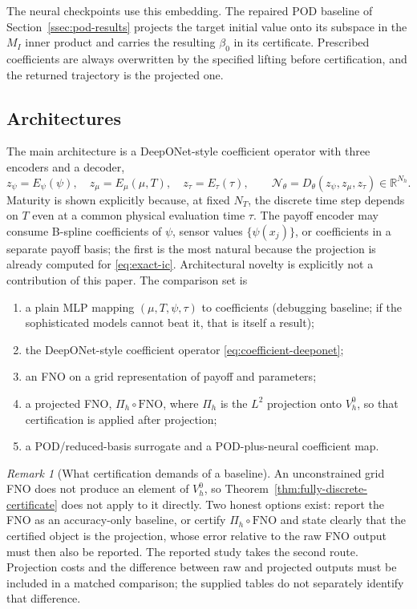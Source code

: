 \documentclass[11pt]{amsart}
\theoremstyle{remark}
\newtheorem{remark}[theorem]{Remark}
\newcommand{\R}{\mathbb{R}}
\newcommand{\Vh}{V_h^0}
\begin{document}
The neural checkpoints use this embedding. The repaired POD baseline of
Section~\ref{ssec:pod-results} projects the target initial value onto its
subspace in the $M_I$ inner product and carries the resulting $\beta_0$ in its
certificate. Prescribed coefficients are always overwritten by the specified
lifting before certification, and the returned trajectory is the projected one.

\subsection{Architectures}
\label{ssec:architectures}

The main architecture is a DeepONet-style coefficient operator with three
encoders and a decoder,
\begin{equation}
  z_\psi=E_\psi(\psi),\quad
  z_\mu=E_\mu(\mu,T),\quad
  z_\tau=E_\tau(\tau),
  \qquad
  \mathcal N_\theta=D_\theta(z_\psi,z_\mu,z_\tau)\in\R^{N_h}.
  \label{eq:coefficient-deeponet}
\end{equation}
Maturity is shown explicitly because, at fixed $N_T$, the discrete time
step depends on $T$ even at a common physical evaluation time $\tau$.
The payoff encoder may consume B-spline coefficients of $\psi$, sensor values
$\{\psi(x_j)\}$, or coefficients in a separate payoff basis; the first is the
most natural because the projection is already computed for
\eqref{eq:exact-ic}.  Architectural novelty is explicitly not a contribution
of this paper.  The comparison set is
\begin{enumerate}[leftmargin=2em]
\item a plain MLP mapping $(\mu,T,\psi,\tau)$ to coefficients (debugging
baseline; if the sophisticated models cannot beat it, that is itself a
result);
\item the DeepONet-style coefficient operator \eqref{eq:coefficient-deeponet};
\item an FNO on a grid representation of payoff and parameters;
\item a projected FNO, $\Pi_h\circ\mathrm{FNO}$, where $\Pi_h$ is the $L^2$
projection onto $\Vh$, so that certification is applied after projection;
\item a POD/reduced-basis surrogate and a POD-plus-neural coefficient map.
\end{enumerate}

\begin{remark}[What certification demands of a baseline]
\label{rem:fno-caveat}
An unconstrained grid FNO does not produce an element of $\Vh$, so
Theorem~\ref{thm:fully-discrete-certificate} does not apply to it directly.
Two honest options exist: report the FNO as an accuracy-only baseline, or
certify $\Pi_h\circ\mathrm{FNO}$ and state clearly that the certified object
is the projection, whose error relative to the raw FNO output must then also
be reported.  The reported study takes the second route. Projection costs and the
difference between raw and projected outputs must be included in a matched
comparison; the supplied tables do not separately identify that difference.
\end{remark}
\end{document}

